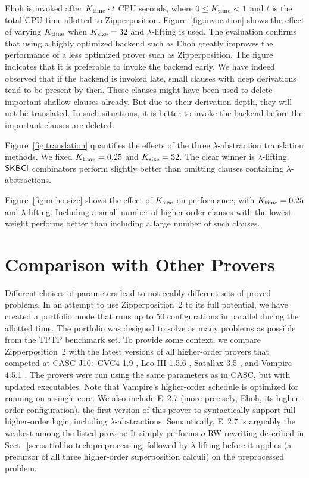 \documentclass[smallcondensed,draft]{svjour3}     %
\begin{document}
  Ehoh is invoked after $ K_\mathrm{time} \cdot t $ CPU seconds, where $0 \le K_\mathrm{time} < 1$ and $t$
  is the total CPU time allotted to Zipperposition. Figure~\ref{fig:invocation}
  shows the effect of varying $K_\mathrm{time}$ when $K_\mathrm{size} = 32$
  and $\lambda$-lifting is used. The evaluation confirms that using a highly
  optimized backend such as Ehoh greatly improves the performance of a
  less optimized prover such as Zipperposition.
  The figure indicates that it is preferable to invoke the backend early. We
  have indeed observed that if the backend is invoked late, small clauses with
  deep derivations tend to be present by then. These clauses might have been
  used to delete important shallow clauses already. But due to their derivation
  depth, they will not be translated. In such situations, it is better to
  invoke the backend before the important clauses are deleted.

  Figure~\ref{fig:translation} quantifies the effects of the three
  $\lambda$-abstraction translation methods. We fixed $K_\mathrm{time} = 0.25$ and
  $K_\mathrm{size}=32$. The clear winner is $\lambda$-lifting.
  ${\mathsf{SKBCI}}$ combinators perform slightly better than omitting clauses
  containing $\lambda$-abstractions.

  Figure~\ref{fig:m-ho-size} shows the effect of $K_\mathrm{size}$ on
  performance, with $K_\mathrm{time} = 0.25$ and $\lambda$-lifting. Including a
  small number of higher-order clauses with the lowest weight performs better
  than including a large number of such clauses.

\section{Comparison with Other Provers}
\label{sec:satfol:ho-tech:comparison}

Different choices of
parameters lead to noticeably different sets of proved problems. In an attempt
to use Zipperposition~2 to its full potential, we have created a portfolio mode
that runs up to 50 configurations in parallel during the allotted time. The portfolio
was designed to solve as many problems as possible from the TPTP benchmark set. To
provide some context, we compare Zipperposition~2 with the latest versions of
all higher-order provers that competed at CASC-J10:\ CVC4 1.9
\cite{cbetal-11-cvc4}, Leo-III 1.5.6 \cite{sb-21-leo3}, Satallax 3.5
\cite{cb-2013-satallax}, and Vampire 4.5.1 \cite{br-20-full-sup-w-combs}.
The provers were run using the same parameters as in CASC, but with updated
executables.
Note that
Vampire's higher-order schedule is optimized for running on a single core.
We also include E~2.7 (more precisely, Ehoh, its higher-order configuration), the first version of this prover to syntactically support
full higher-order logic, including $\lambda$-abstractions.
Semantically, E~2.7 is arguably the weakest among the listed provers:
It simply performs $o$-RW rewriting described in Sect.~\ref{sec:satfol:ho-tech:preprocessing} followed by
$\lambda$-lifting before it applies  \cite{bbcw-21-lfho}
(a precursor of all three higher-order superposition calculi) on the preprocessed problem.
\end{document}

